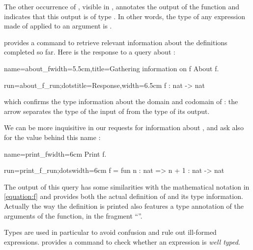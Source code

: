 The other occurrence  of , visible in ,
annotates the output of the function and indicates that this output is
of type . In other words, the type of any expression made of
 applied to an argument is .

\Coq{} provides a command to retrieve relevant information about the
definitions completed so far. Here is the response to a query about :

\begin{coq}{name=about_f}{width=5.5cm,title=Gathering information on f}
About f.
\end{coq}
\begin{coqout}{run=about_f_run;dots}{title=Response,width=6.5cm}
f : nat -> nat
\end{coqout}
which confirms the type information about the domain and codomain of
: the arrow \C{->} separates the type of the input of  from
the type of its output.

We can be more inquisitive in our requests for information about
, and ask also for the value behind this name :

\begin{coq}{name=print_f}{width=6cm}
Print f.
$~$
\end{coq}
\begin{coqout}{run=print_f_run;dots}{width=6cm}
f = fun n : nat => n + 1
  : nat -> nat
\end{coqout}

The output of this  query has some similarities with the
 mathematical notation in \eqref{equation:f} and provides both the
 actual definition of  and its type information. Actually the way
 the definition is printed also features a type annotation of the
 arguments of the function, in the fragment ``''.

Types are used in particular to avoid confusion and rule out
ill-formed expressions. \Coq{} provides a command to check whether
an expression is \emph{well typed}.

